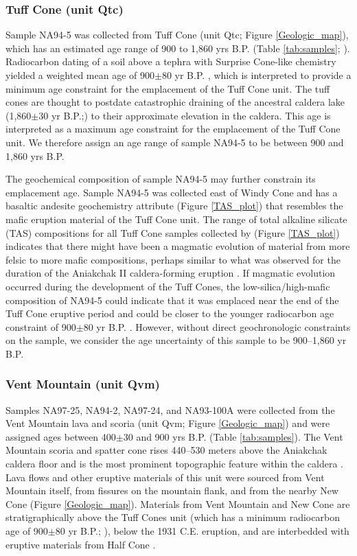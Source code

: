 \documentclass[draft]{agujournal2019}
\begin{document}
\subsubsection{Tuff Cone (unit Qtc)}
Sample NA94-5 was collected from Tuff Cone (unit Qtc; Figure \ref{Geologic_map}), which has an estimated age range of 900 to 1,860 yrs B.P. (Table \ref{tab:samples}; ). Radiocarbon dating of a soil above a tephra with Surprise Cone-like chemistry yielded a weighted mean age of 900$\pm$80 yr B.P. \cite{Bacon2014a}, which is interpreted to provide a minimum age constraint for the emplacement of the Tuff Cone unit. The tuff cones are thought to postdate catastrophic draining of the ancestral caldera lake (1,860$\pm$30 yr B.P.;) to their approximate elevation in the caldera. This age is interpreted as a maximum age constraint for the emplacement of the Tuff Cone unit. We therefore assign an age range of sample NA94-5 to be between 900 and 1,860 yrs B.P. 

The geochemical composition of sample NA94-5 may further constrain its emplacement age. Sample NA94-5 was collected east of Windy Cone and has a basaltic andesite geochemistry attribute (Figure \ref{TAS_plot}) that resembles the mafic eruption material of the Tuff Cone unit. The range of total alkaline silicate (TAS) compositions for all Tuff Cone samples collected by  (Figure \ref{TAS_plot}) indicates that there might have been a magmatic evolution of material from more felsic to more mafic compositions, perhaps similar to what was observed for the duration of the Aniakchak II caldera-forming eruption \cite{Bacon2014a}. If magmatic evolution occurred during the development of the Tuff Cones, the low-silica/high-mafic composition of NA94-5 could indicate that it was emplaced near the end of the Tuff Cone eruptive period and could be closer to the younger radiocarbon age constraint of 900$\pm$80 yr B.P. \cite{Bacon2014a}. However, without direct geochronologic constraints on the sample, we consider the age uncertainty of this sample to be 900–1,860 yr B.P. 

\subsubsection{Vent Mountain (unit Qvm)}
Samples NA97-25, NA94-2, NA97-24, and NA93-100A were collected from the Vent Mountain lava and scoria (unit Qvm; Figure \ref{Geologic_map}) and were assigned ages between 400$\pm$30 and 900 yrs B.P. (Table \ref{tab:samples}). The Vent Mountain scoria and spatter cone rises 440–530 meters above the Aniakchak caldera floor and is the most prominent topographic feature within the caldera \cite{Bacon2014a}. Lava flows and other eruptive materials of this unit were sourced from Vent Mountain itself, from fissures on the mountain flank, and from the nearby New Cone (Figure \ref{Geologic_map}). Materials from Vent Mountain and New Cone are stratigraphically above the Tuff Cones unit (which has a minimum radiocarbon age of 900$\pm$80 yr B.P.; ), below the 1931 C.E. eruption, and are interbedded with eruptive materials from Half Cone \cite{Bacon2014a}. 
\end{document}
